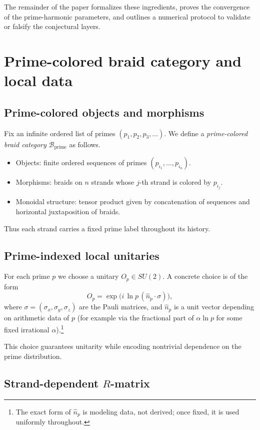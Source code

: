 \documentclass[11pt]{article}
\begin{document}
The remainder of the paper formalizes these ingredients, proves the convergence of the prime-harmonic parameters, and outlines a numerical protocol to validate or falsify the conjectural layers.

\section{Prime-colored braid category and local data}

\subsection{Prime-colored objects and morphisms}

Fix an infinite ordered list of primes $(p_1,p_2,p_3,\dots)$.
We define a \emph{prime-colored braid category} $\mathcal B_{\mathrm{prime}}$ as follows.

\begin{itemize}[leftmargin=1.5em]
  \item Objects: finite ordered sequences of primes $(p_{i_1},\dots,p_{i_n})$.
  \item Morphisms: braids on $n$ strands whose $j$-th strand is colored by $p_{i_j}$.
  \item Monoidal structure: tensor product given by concatenation of sequences and horizontal juxtaposition of braids.
\end{itemize}

Thus each strand carries a fixed prime label throughout its history.

\subsection{Prime-indexed local unitaries}

For each prime $p$ we choose a unitary $O_p\in SU(2)$.
A concrete choice is of the form
\[
  O_p = \exp\bigl(i\,\ln p\,(\hat n_p\cdot \sigma)\bigr),
\]
where $\sigma=(\sigma_x,\sigma_y,\sigma_z)$ are the Pauli matrices, and $\hat n_p$ is a unit vector depending on arithmetic data of $p$ (for example via the fractional part of $\alpha\ln p$ for some fixed irrational $\alpha$).\footnote{The exact form of $\hat n_p$ is modeling data, not derived; once fixed, it is used uniformly throughout.}

This choice guarantees unitarity while encoding nontrivial dependence on the prime distribution.

\subsection{Strand-dependent $R$-matrix}
\end{document}
